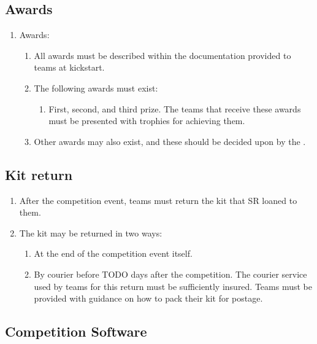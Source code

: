 \subsection{Awards}
\begin{enumerate}
\item Awards:
  \begin{enumerate}
  \item All awards must be described within the documentation provided to teams at kickstart.
  \item The following awards must exist:
    \begin{enumerate}
    \item First, second, and third prize.  The teams that receive these awards must be presented with trophies for achieving them.
    \end{enumerate}
  \item Other awards may also exist, and these should be decided upon by the .
  \end{enumerate}
\end{enumerate}

\subsection{Kit return}
  \begin{enumerate}
  \item After the competition event, teams must return the kit that SR loaned to them.
  \item The kit may be returned in two ways:
    \begin{enumerate}
    \item At the end of the competition event itself.
    \item By courier before TODO days after the competition.  The courier service used by teams for this return must be sufficiently insured.  Teams must be provided with guidance on how to pack their kit for postage.
    \end{enumerate}
  \end{enumerate}


\subsection{Competition Software}

